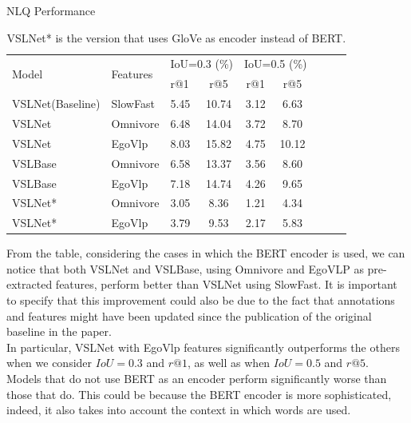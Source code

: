 \documentclass[10pt,twocolumn,letterpaper]{article}
\begin{document}
\begin{table}[h]
\centering
\small 
\caption{NLQ Performance}
\label{tab:performance}
\begin{tabular}{@{}p{2.4cm}p{1.0cm}lcccccc@{}}
\toprule
\multirow{2}{*}{Model} & \multirow{2}{*}{Features} & \multicolumn{2}{c}{IoU=0.3 (\%)} & \multicolumn{2}{c}{IoU=0.5 (\%)} \\ 
& & r@1  & r@5 & r@1   & r@5       \\ \midrule
VSLNet\hspace{0.2mm}(Baseline) & SlowFast & 5.45 & 10.74 & 3.12 & 6.63 \\ 
VSLNet & Omnivore & 6.48 & 14.04 & 3.72 & 8.70 \\ 
VSLNet & EgoVlp & 8.03 & 15.82 & 4.75 & 10.12 \\ 
VSLBase & Omnivore & 6.58 & 13.37 & 3.56 & 8.60 \\
VSLBase & EgoVlp & 7.18 & 14.74 & 4.26 & 9.65 \\
VSLNet* & Omnivore & 3.05 & 8.36 & 1.21 & 4.34 \\
VSLNet* & EgoVlp & 3.79 & 9.53 & 2.17 & 5.83 \\
\bottomrule
\end{tabular}
\captionsetup{font=footnotesize}
\caption*{VSLNet* is the version that uses GloVe as encoder instead of BERT.}
\end{table}

From the table, considering the cases in which the BERT encoder is used, we can notice that both VSLNet and VSLBase, using Omnivore and EgoVLP as pre-extracted features, perform better than VSLNet using SlowFast. It is important to specify that this improvement could also be due to the fact that annotations and features might have been updated since the publication of the original baseline in the paper.
\\
In particular, VSLNet with EgoVlp features significantly outperforms the others when we consider $IoU = 0.3$ and $r@1$, as well as when $IoU = 0.5$ and $r@5$.
\\
Models that do not use BERT as an encoder perform significantly worse than those that do. This could be because the BERT encoder is more sophisticated, indeed, it also takes into account the context in which words are used.
\end{document}
